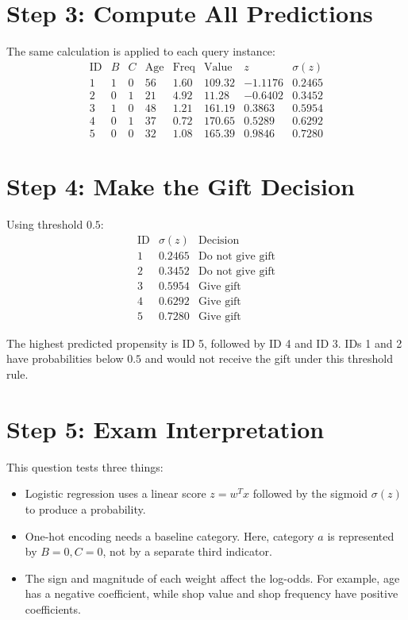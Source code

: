 \documentclass[11pt]{article}
\begin{document}
\section*{Step 3: Compute All Predictions}

The same calculation is applied to each query instance:
\[
\begin{array}{c|c|c|r|r|r|r|c}
\text{ID} & B & C & \text{Age} & \text{Freq} & \text{Value} & z & \sigma(z)\\
\hline
1 & 1 & 0 & 56 & 1.60 & 109.32 & -1.1176 & 0.2465\\
2 & 0 & 1 & 21 & 4.92 & 11.28 & -0.6402 & 0.3452\\
3 & 1 & 0 & 48 & 1.21 & 161.19 & 0.3863 & 0.5954\\
4 & 0 & 1 & 37 & 0.72 & 170.65 & 0.5289 & 0.6292\\
5 & 0 & 0 & 32 & 1.08 & 165.39 & 0.9846 & 0.7280
\end{array}
\]

\section*{Step 4: Make the Gift Decision}

Using threshold $0.5$:
\[
\begin{array}{c|r|c}
\text{ID} & \sigma(z) & \text{Decision}\\
\hline
1 & 0.2465 & \text{Do not give gift}\\
2 & 0.3452 & \text{Do not give gift}\\
3 & 0.5954 & \text{Give gift}\\
4 & 0.6292 & \text{Give gift}\\
5 & 0.7280 & \text{Give gift}
\end{array}
\]

The highest predicted propensity is ID 5, followed by ID 4 and ID 3. IDs 1 and 2 have probabilities below $0.5$ and would not receive the gift under this threshold rule.

\section*{Step 5: Exam Interpretation}

This question tests three things:
\begin{itemize}
\item Logistic regression uses a linear score $z=w^Tx$ followed by the sigmoid $\sigma(z)$ to produce a probability.
\item One-hot encoding needs a baseline category. Here, category $a$ is represented by $B=0,C=0$, not by a separate third indicator.
\item The sign and magnitude of each weight affect the log-odds. For example, age has a negative coefficient, while shop value and shop frequency have positive coefficients.
\end{itemize}
\end{document}
